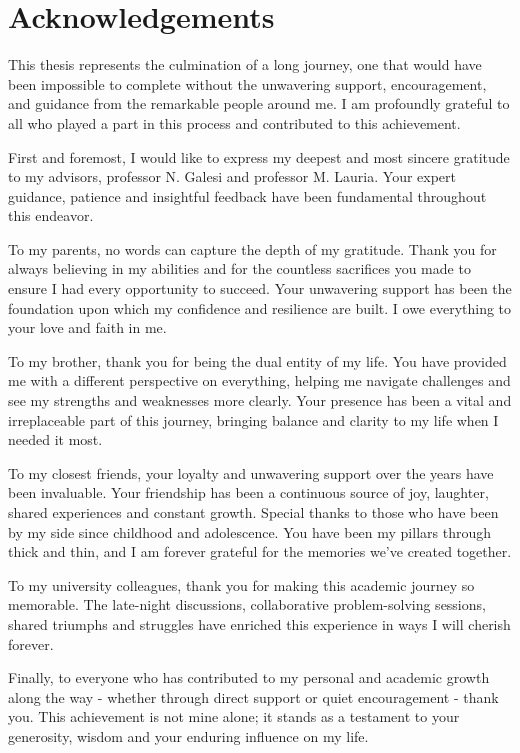 \chapter*{Acknowledgements}

This thesis represents the culmination of a long journey, one that would have been impossible to complete without the unwavering support, encouragement, and guidance from the remarkable people around me. I am profoundly grateful to all who played a part in this process and contributed to this achievement.

First and foremost, I would like to express my deepest and most sincere gratitude to my advisors, professor N. Galesi and professor M. Lauria. Your expert guidance, patience and insightful feedback have been fundamental throughout this endeavor. 

To my parents, no words can capture the depth of my gratitude. Thank you for always believing in my abilities and for the countless sacrifices you made to ensure I had every opportunity to succeed. Your unwavering support has been the foundation upon which my confidence and resilience are built. I owe everything to your love and faith in me.

To my brother, thank you for being the dual entity of my life. You have provided me with a different perspective on everything, helping me navigate challenges and see my strengths and weaknesses more clearly. Your presence has been a vital and irreplaceable part of this journey, bringing balance and clarity to my life when I needed it most.

To my closest friends, your loyalty and unwavering support over the years have been invaluable. Your friendship has been a continuous source of joy, laughter, shared experiences and constant growth. Special thanks to those who have been by my side since childhood and adolescence. You have been my pillars through thick and thin, and I am forever grateful for the memories we've created together.

To my university colleagues, thank you for making this academic journey so memorable. The late-night discussions, collaborative problem-solving sessions, shared triumphs and struggles have enriched this experience in ways I will cherish forever.

Finally, to everyone who has contributed to my personal and academic growth along the way - whether through direct support or quiet encouragement - thank you. This achievement is not mine alone; it stands as a testament to your generosity, wisdom and your enduring influence on my life.